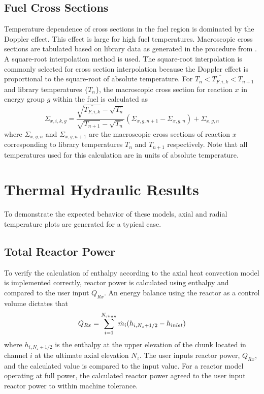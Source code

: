   \subsection{Fuel Cross Sections}
    Temperature dependence of cross sections in the fuel region is dominated
    by the Doppler effect. This effect is large for high fuel temperatures.
    Macroscopic cross sections are tabulated based on library data as generated 
    in the procedure from . A square-root 
    interpolation method is used. The square-root interpolation is commonly 
    selected for cross section interpolation because the Doppler effect is 
    proportional to the square-root of absolute temperature. For 
    ${T_n < \overline{T_{F,i,k}} < T_{n+1}}$ and library temperatures $\{T_n\}$,
    the macroscopic cross section for reaction $x$ in energy group $g$ within 
    the fuel is calculated as
    \begin{equation}
      \Sigma_{x,i,k,g} = 
        \frac{\sqrt{\overline{T_{F,i,k}}} - \sqrt{T_{n}}}
        {\sqrt{T_{n+1}}-\sqrt{T_{n}}}
        (\Sigma_{x,g,n+1} - \Sigma_{x,g,n})  + \Sigma_{x,g,n}
    \end{equation}
    where $\Sigma_{x,g,n}$ and $\Sigma_{x,g,n+1}$ are the macroscopic
    cross sections of reaction $x$ corresponding to library temperatures $T_n$
    and $T_{n+1}$ respectively. Note that all temperatures used for this 
    calculation are in units of absolute temperature.
      
\section{Thermal Hydraulic Results}
  To demonstrate the expected behavior of these models, axial and radial
  temperature plots are generated for a typical case. 
  
  \subsection{Total Reactor Power}
    To verify the calculation of enthalpy according to the axial heat convection
    model is implemented correctly, reactor power is calculated using enthalpy
    and compared to the user input $Q_{Rx}$. An energy balance using the reactor
    as a control volume dictates that
    \begin{equation}
      \label{eq:reactor_energy_balance}
      Q_{Rx} = \sum_{i=1}^{N_{chan}} \dot{m}_i (h_{i,N_z+1/2} - h_{inlet})
    \end{equation}
    where $h_{i,N_z+1/2}$ is the enthalpy at the upper elevation of the chunk
    located in channel $i$ at the ultimate axial elevation $N_z$. The user
    inputs reactor power, $Q_{Rx}$, and the calculated value is compared to the
    input value. For a reactor model operating at full power, the calculated
    reactor power agreed to the user input reactor power to within machine
    tolerance.

